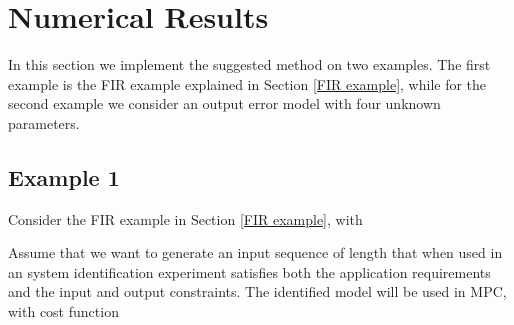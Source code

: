 \documentclass{ifacconf}
\begin{document}
\section{Numerical Results}
\label{sec:Numerical Results}
In this section we implement the suggested method on two examples. The first example is the FIR example explained in Section \ref{FIR example}, while for the second example we consider an output error model with four unknown parameters.
\subsection{Example 1}
Consider the FIR example in Section \ref{FIR example}, with 
\vspace{-0.4cm}

Assume that we want to generate an input sequence of length  that when used in an system identification experiment satisfies both the application requirements and the input and output constraints. The identified model will be used in MPC, with cost function
\end{document}
